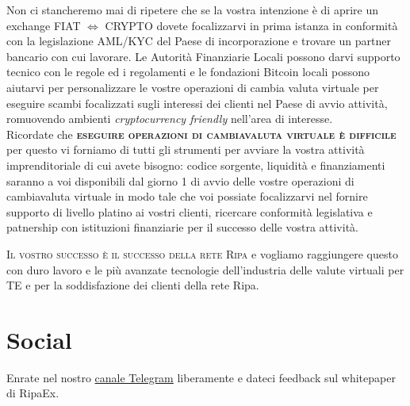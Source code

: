 \documentclass[11pt,fleqn]{book} %
\begin{document}
Non ci stancheremo mai di ripetere che se la vostra intenzione è di aprire un exchange FIAT $\Leftrightarrow$ CRYPTO 
dovete focalizzarvi in prima istanza in conformità con la legislazione AML/KYC del Paese di incorporazione
e trovare un partner bancario con cui lavorare. Le Autorità Finanziarie Locali possono darvi supporto tecnico
con le regole ed i regolamenti e le fondazioni Bitcoin locali possono aiutarvi per personalizzare le vostre
operazioni di cambia valuta virtuale per eseguire scambi focalizzati sugli interessi dei clienti nel Paese di avvio
attività, romuovendo ambienti \textit{cryptocurrency friendly} nell'area di interesse.\\

Ricordate che \textbf{\textsc{eseguire operazioni di cambiavaluta virtuale è difficile}} per questo vi forniamo di tutti
gli strumenti per avviare la vostra attività imprenditoriale di cui avete bisogno: codice sorgente,
liquidità e finanziamenti saranno a voi disponibili dal giorno 1 di avvio delle vostre operazioni di cambiavaluta virtuale
in modo tale che voi possiate focalizzarvi nel fornire supporto di livello platino ai vostri clienti, ricercare
conformità legislativa e patnership con istituzioni finanziarie per il successo delle vostra attività.

\textsc{Il vostro successo è il successo della rete Ripa} e vogliamo raggiungere questo con duro lavoro e le più 
avanzate tecnologie dell'industria delle valute virtuali per \textsc{TE} e per la soddisfazione dei clienti della
rete Ripa.

\newpage
\section{Social}
\label{sec:social}
Enrate nel nostro \href{https://t.me/ripaex}{canale Telegram} liberamente e dateci feedback sul whitepaper di RipaEx.\\
\end{document}
